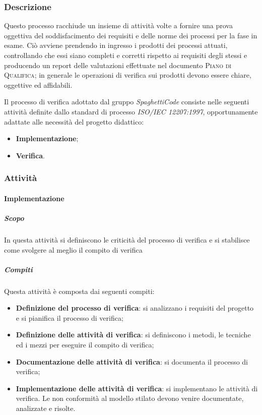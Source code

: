 \subsubsection{Descrizione}
Questo processo racchiude un insieme di attività volte a fornire una prova oggettiva del soddisfacimento dei requisiti e delle norme dei
processi per la fase in esame. Ciò avviene prendendo in ingresso i prodotti dei processi attuati, controllando che essi siano completi e corretti
rispetto ai requisiti degli stessi e producendo un report delle valutazioni effettuate nel documento \textsc{Piano di Qualifica}; in
generale le operazioni di verifica sui prodotti devono essere chiare, oggettive ed affidabili.

Il processo di verifica adottato dal gruppo \emph{SpaghettiCode} consiste nelle seguenti attività definite dallo standard di processo \emph{ISO/IEC 12207:1997}, opportunamente adattate alle necessità del progetto didattico:
\begin{itemize}
	\item \textbf{Implementazione};
	\item \textbf{Verifica}.
\end{itemize}

\subsubsection{Attività}

\paragraph{Implementazione}
\label{par:implementazione}
\subparagraph{Scopo}
\label{par:implementazione:scopo}
In questa attività si definiscono le criticità del processo di verifica e si stabilisce come svolgere al meglio il compito di verifica\\
\subparagraph{Compiti}
\label{par:implementazione:compiti}
Questa attività è composta dai seguenti compiti:
\begin{itemize}
    \item \textbf{Definizione del processo di verifica}: si analizzano i requisiti del progetto e si pianifica il processo di verifica;
    \item \textbf{Definizione delle attività di verifica}: si definiscono i metodi, le tecniche ed i mezzi per eseguire il compito di verifica;
    \item \textbf{Documentazione delle attività di verifica}: si documenta il processo di verifica;
    \item \textbf{Implementazione delle attività di verifica}: si implementano le attività di verifica. Le non conformità al modello stilato devono venire documentate, analizzate e risolte.
\end{itemize}


